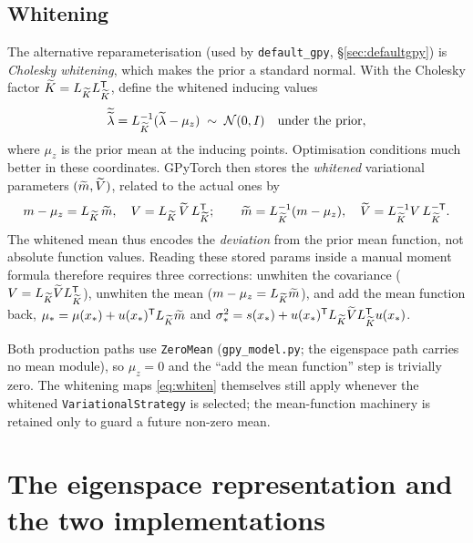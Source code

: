 \subsection{Whitening}\label{sec:whitening}

The alternative reparameterisation (used by \texttt{default\_gpy},
\S\ref{sec:defaultgpy}) is \emph{Cholesky whitening}, which makes the prior a
standard normal. With the Cholesky factor $\widetilde{K}=L_{\widetilde{K}}L_{\widetilde{K}}^{\mathsf{T}}$, define
the whitened inducing values
\begin{equation}
  \widetilde{\widetilde{\lambda}}=L_{\widetilde{K}}^{-1}(\widetilde{\lambda}-\mu_z)\;\sim\;\mathcal{N}(0,I)\quad\text{under the prior},
\end{equation}
where $\mu_z$ is the prior mean at the inducing points. Optimisation conditions
much better in these coordinates. GPyTorch then stores the \emph{whitened}
variational parameters $(\widetilde{m},\widetilde{V})$, related to the actual
ones by
\begin{equation}
  m-\mu_z=L_{\widetilde{K}}\,\widetilde{m},\quad V=L_{\widetilde{K}}\,\widetilde{V}\,L_{\widetilde{K}}^{\mathsf{T}};
  \qquad
  \widetilde{m}=L_{\widetilde{K}}^{-1}(m-\mu_z),\quad \widetilde{V}=L_{\widetilde{K}}^{-1}V\,L_{\widetilde{K}}^{-\mathsf{T}}.
  \label{eq:whiten}
\end{equation}
The whitened mean thus encodes the \emph{deviation} from the prior mean function,
not absolute function values. Reading these stored params inside a manual moment
formula therefore requires three corrections: unwhiten the covariance
($V=L_{\widetilde{K}}\widetilde{V}L_{\widetilde{K}}^{\mathsf{T}}$), unwhiten the mean
($m-\mu_z=L_{\widetilde{K}}\widetilde{m}$), and add the mean function back,
$\mu_\ast=\mu(x_\ast)+u(x_\ast)^{\mathsf{T}}L_{\widetilde{K}}\widetilde{m}$ and
$\sigma^{2}_\ast=s(x_\ast)+u(x_\ast)^{\mathsf{T}}L_{\widetilde{K}}\widetilde{V}L_{\widetilde{K}}^{\mathsf{T}}u(x_\ast)$.

\begin{remark}
Both production paths use \texttt{ZeroMean} (\texttt{gpy\_model.py}; the
eigenspace path carries no mean module), so $\mu_z=0$ and the ``add the mean
function'' step is trivially zero. The whitening maps \eqref{eq:whiten}
themselves still apply whenever the whitened \texttt{VariationalStrategy} is
selected; the mean-function machinery is retained only to guard a future non-zero
mean.
\end{remark}


\section{The eigenspace representation and the two implementations}\label{sec:eigenspace}

